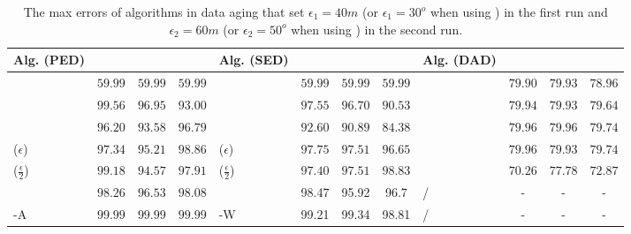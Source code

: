 {\begin{table}
	\caption{\small The max errors of algorithms in data aging that set $\epsilon_1=40m$ (or $\epsilon_1=30^o$ when using \dad) in the first run and $\epsilon_2=60m$ (or $\epsilon_2=50^o$ when using \dad) in the second run.}
	\centering
	\scriptsize
	\vspace{-1ex}
	\begin{tabular}{|l|c|c|c|l|c|c|c|l|c|c|c|}
		\hline
		\bf{Alg. (PED)}  &\ucar &\geolife &\mopsi & \bf{Alg. (SED)}  &\ucar &\geolife &\mopsi &\bf{Alg. (DAD)}  &\ucar &\geolife &\mopsi \\
		\hline
		{\dpa} &	$59.99$ & $59.99 $ &	$59.99$	&\dpa &$59.99$ &$59.99$ & $59.99$ & \dpa	& $79.90$	& $79.93$	& $78.96 $ \\
		\hline
		{\tpa} &	$99.56$ & $96.95$ &	$93.00$	&\tpa 	& $97.55$& $96.70$ &$90.53$ & \tpa	& $79.94$	& $79.93$	& $79.64$ \\
		\hline
		{\bqsa} &	$96.20 $ & $93.58  $ &	$96.79 $	&\squishe &$92.60$ &$90.89$ & $84.38$ & \opwa	& $79.96$	& $79.96$	& $79.74$ \\
		\hline
		{\siped($\epsilon$)} &	$97.34   $ & $95.21  $ &	$98.86   $	&\cised($\epsilon$) & $97.75$ &$97.51$ &$96.65$ & \interval	& $79.96$	& $79.93$	& $79.74$ \\
		\hline
		{\siped($\frac{\epsilon}{2}$)} &	$99.18  $ & $94.57  $ &	$97.91  $ &\cised($\frac{\epsilon}{2}$) &$ 97.40 $ & $97.51$ & $98.83$& \intersec	& $70.26 $	& $77.78$	& $72.87$ \\
		\hline
		{\operb} &	${98.26} $ & ${96.53} $ & ${98.08} $	& {\dagots} &98.47 &95.92 &96.7 & / &- &- &- \\
		\hline
		{\operb-A} &	${99.99} $ & ${99.99} $ & ${99.99} $	& {\cised-W} &99.21 &99.34 &98.81 & / &- &- &- \\
		\hline
	\end{tabular}
	\label{tab:aging-me}

	\vspace{-1ex}
\end{table}


}
